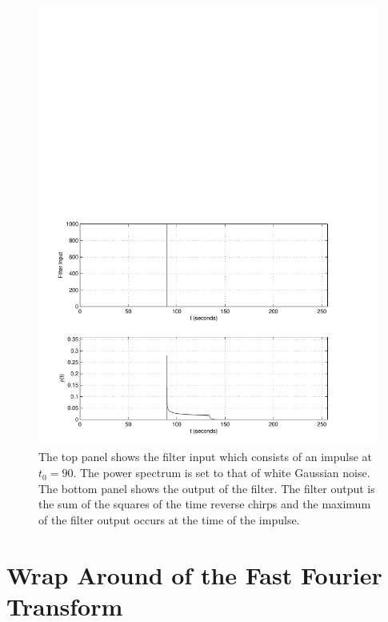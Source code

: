 \begin{figure}[htb]
\label{f:impuse_snr}
\begin{center}
\includegraphics[width=\linewidth]{figures/findchirp/impulse_snr}
\end{center}
\caption{%
The top panel shows the filter input which consists of an impulse at $t_0 = 90$.
The power spectrum is set to that of white Gaussian noise. The bottom panel
shows the output of the filter. The filter output is the sum of the squares of
the time reverse chirps and the maximum of the filter output occurs at the
time of the impulse.
}
\end{figure}

\section{Wrap Around of the Fast Fourier Transform}
\label{s:wraparound}

